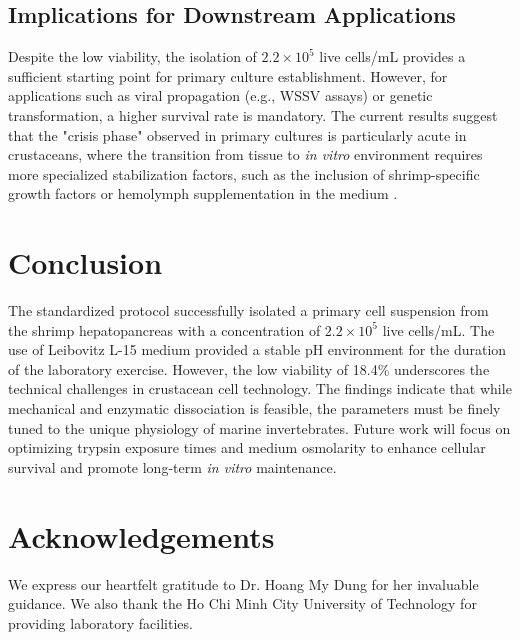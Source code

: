 \documentclass[a4paper]{article}
\begin{document}
\subsection{Implications for Downstream Applications}
Despite the low viability, the isolation of $2.2 \times 10^5$ live cells/mL provides a sufficient starting point for primary culture establishment. However, for applications such as viral propagation (e.g., WSSV assays) or genetic transformation, a higher survival rate is mandatory. The current results suggest that the "crisis phase" observed in primary cultures is particularly acute in crustaceans, where the transition from tissue to \textit{in vitro} environment requires more specialized stabilization factors, such as the inclusion of shrimp-specific growth factors or hemolymph supplementation in the medium \cite{6}.

\section{Conclusion}
The standardized protocol successfully isolated a primary cell suspension from the shrimp hepatopancreas with a concentration of $2.2 \times 10^5$ live cells/mL. The use of Leibovitz L-15 medium provided a stable pH environment for the duration of the laboratory exercise. However, the low viability of 18.4\% underscores the technical challenges in crustacean cell technology. The findings indicate that while mechanical and enzymatic dissociation is feasible, the parameters must be finely tuned to the unique physiology of marine invertebrates. Future work will focus on optimizing trypsin exposure times and medium osmolarity to enhance cellular survival and promote long-term \textit{in vitro} maintenance.

\section*{Acknowledgements}
We express our heartfelt gratitude to Dr. Hoang My Dung for her invaluable guidance. We also thank the Ho Chi Minh City University of Technology for providing laboratory facilities.
\end{document}
